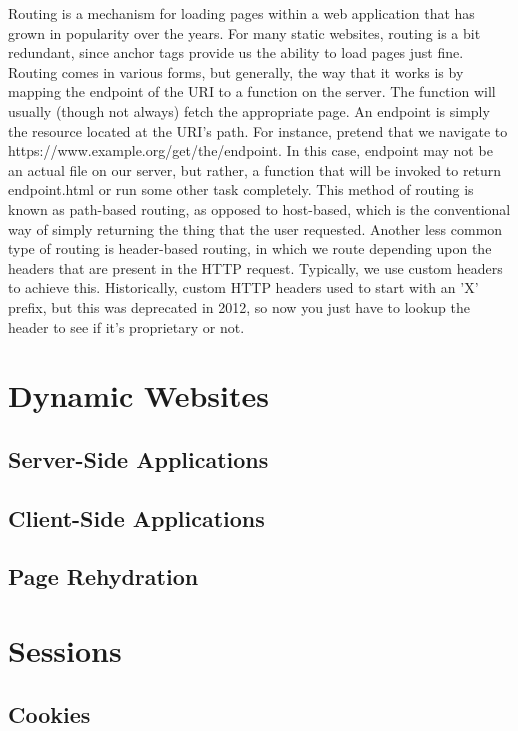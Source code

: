 \documentclass{article}
\begin{document}
Routing is a mechanism for loading pages within a web application that has grown in popularity over the years.
For many static websites, routing is a bit redundant, since anchor tags provide us the ability to load pages
just fine. Routing comes in various forms, but generally, the way that it works is by mapping the endpoint of
the URI to a function on the server. The function will usually (though not always) fetch the appropriate page.
An endpoint is simply the resource located at the URI's path. For instance, pretend that we navigate to
https://www.example.org/get/the/endpoint. In this case, endpoint may not be an actual file on our server, but
rather, a function that will be invoked to return endpoint.html or run some other task completely. This
method of routing is known as path-based routing, as opposed to host-based, which is the conventional way of
simply returning the thing that the user requested. Another less common type of routing is header-based
routing, in which we route depending upon the headers that are present in the HTTP request. Typically, we use
custom headers to achieve this. Historically, custom HTTP headers used to start with an 'X' prefix, but this
was deprecated in 2012, so now you just have to lookup the header to see if it's proprietary or not.

\section{Dynamic Websites}

\subsection{Server-Side Applications}

\subsection{Client-Side Applications}

\subsection{Page Rehydration}

\section{Sessions}

\subsection{Cookies}
\end{document}
